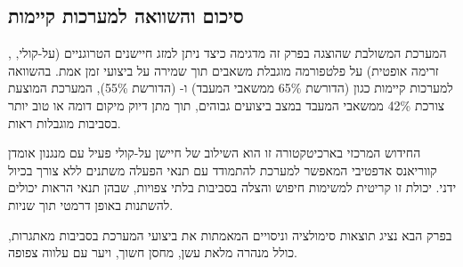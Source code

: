 \begin{table}[htbp]
\centering
\caption{השוואת ביצועי המערכת במצבי פעולה שונים. (System performance comparison across different operating modes.)}
\label{tab:ch07_performance_modes}
\end{table}

\subsection{סיכום והשוואה למערכות קיימות}
\label{sec:ch07_summary}

המערכת המשולבת שהוצגה בפרק זה מדגימה כיצד ניתן למזג חיישנים הטרוגניים (על-קולי, , זרימה אופטית) על פלטפורמה מוגבלת משאבים תוך שמירה על ביצועי זמן אמת. בהשוואה למערכות קיימות כגון  (הדורשת 65\% ממשאבי המעבד) ו- (הדורשת 55\%), המערכת המוצעת צורכת 42\% ממשאבי המעבד במצב ביצועים גבוהים, תוך מתן דיוק מיקום דומה או טוב יותר בסביבות מוגבלות ראות. \cite{CrewAIDocs} \cite{Thrun2005ProbRobotics}

החידוש המרכזי בארכיטקטורה זו הוא השילוב של חיישן על-קולי פעיל עם מנגנון אומדן קווריאנס אדפטיבי המאפשר למערכת להתמודד עם תנאי הפעלה משתנים ללא צורך בכיול ידני. יכולת זו קריטית למשימות חיפוש והצלה בסביבות בלתי צפויות, שבהן תנאי הראות יכולים להשתנות באופן דרמטי תוך שניות. \cite{Thrun2005ProbRobotics}

בפרק הבא נציג תוצאות סימולציה וניסויים המאמתות את ביצועי המערכת בסביבות מאתגרות, כולל מנהרה מלאת עשן, מחסן חשוך, ויער עם עלווה צפופה.

